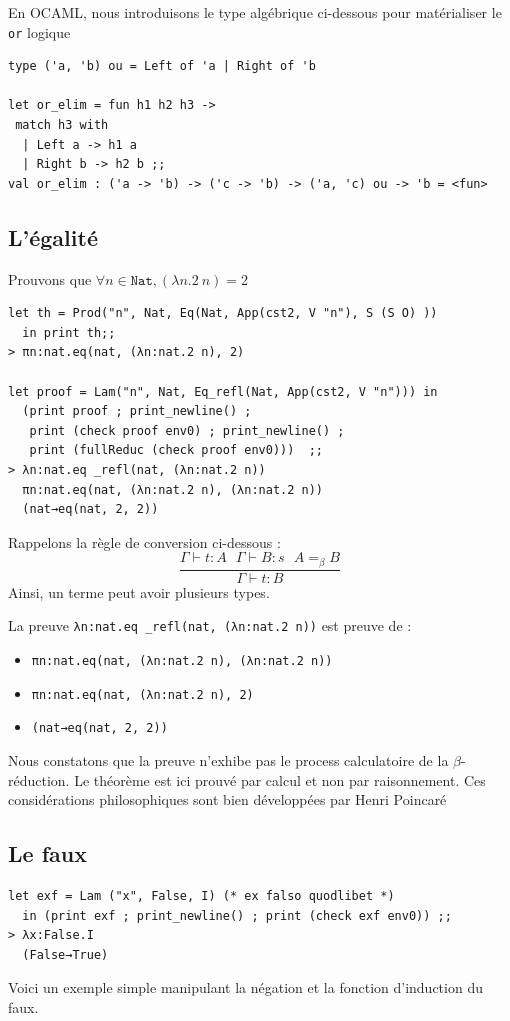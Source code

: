 \documentclass[11pt]{book}
\begin{document}
En OCAML, nous introduisons le type algébrique ci-dessous pour matérialiser le \verb+or+ logique
\begin{Verbatim}
type ('a, 'b) ou = Left of 'a | Right of 'b	

let or_elim = fun h1 h2 h3 ->
 match h3 with
  | Left a -> h1 a
  | Right b -> h2 b ;;
val or_elim : ('a -> 'b) -> ('c -> 'b) -> ('a, 'c) ou -> 'b = <fun>
\end{Verbatim}

\subsection{L'égalité}
Prouvons que $\forall n \in \mathtt{Nat}, (\lambda n.2\  n) = 2$
\begin{Verbatim}
let th = Prod("n", Nat, Eq(Nat, App(cst2, V "n"), S (S O) )) 
  in print th;;
> πn:nat.eq(nat, (λn:nat.2 n), 2)

let proof = Lam("n", Nat, Eq_refl(Nat, App(cst2, V "n"))) in 
  (print proof ; print_newline() ;
   print (check proof env0) ; print_newline() ; 
   print (fullReduc (check proof env0)))  ;;
> λn:nat.eq _refl(nat, (λn:nat.2 n))
  πn:nat.eq(nat, (λn:nat.2 n), (λn:nat.2 n))
  (nat→eq(nat, 2, 2))
\end{Verbatim}
Rappelons la règle de conversion ci-dessous :
$$
\frac{\Gamma ⊢ t:A \ \ \     \Gamma ⊢ B:s \ \ \     A=_\beta B}{\Gamma ⊢ t:B}
$$
Ainsi, un terme peut avoir plusieurs types.

\noindent La preuve \verb+λn:nat.eq _refl(nat, (λn:nat.2 n))+ est preuve de :
\begin{itemize}
 \item \verb+πn:nat.eq(nat, (λn:nat.2 n), (λn:nat.2 n))+
 \item \verb+πn:nat.eq(nat, (λn:nat.2 n), 2)+
 \item \verb+(nat→eq(nat, 2, 2))+
\end{itemize}
Nous constatons que la preuve n'exhibe pas le process calculatoire de la $\beta$-réduction.
Le théorème est ici prouvé par calcul et non par raisonnement. Ces considérations philosophiques sont bien développées
par Henri Poincaré\cite{poincare}

\subsection{Le faux}

\begin{Verbatim}
let exf = Lam ("x", False, I) (* ex falso quodlibet *)
  in (print exf ; print_newline() ; print (check exf env0)) ;;
> λx:False.I
  (False→True) 
\end{Verbatim}
Voici un exemple simple manipulant la négation et la fonction d'induction du faux.
\end{document}
